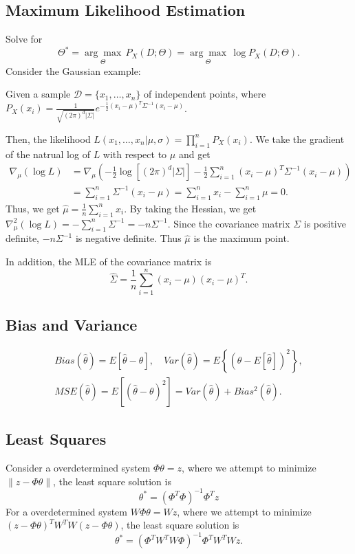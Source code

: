\documentclass{article}
\newenvironment{topic}[1]{\subsection*{#1}}{}
\begin{document}
\begin{topic}{Maximum Likelihood Estimation}
    Solve for
    \[
        \Theta^* = \underset{\Theta}{\arg \max} \, P_X(D;\Theta) = \underset{\Theta}{\arg \max} \, \log P_X(D;\Theta).
    \]
    Consider the Gaussian example: 
    
    Given a sample $\mathcal{D} = \{x_1, \dots , x_n\}$ of independent points, where $P_X(x_i) = \frac{1}{\sqrt{(2\pi)^d|\Sigma|}}e^{-\frac{1}{2}(x_i - \mu)^T\Sigma^{-1}(x_i - \mu)}$.

    Then, the likelihood $L(x_1, \dots, x_n|\mu, \sigma) = \prod_{i = 1}^n P_X(x_i)$.
    We take the gradient of the natrual log of $L$ with respect to $\mu$ and get
    \begin{align*}
        \nabla_{\mu} (\log L) 
        &= \nabla_{\mu} \left(-\frac{1}{2}\log[(2\pi)^d|\Sigma|] - \frac{1}{2} \sum_{i = 1}^n (x_i - \mu)^T\Sigma^{-1}(x_i - \mu)\right) \\
        &= \sum_{i = 1}^n \Sigma^{-1}(x_i - \mu) = \sum_{i = 1}^n x_i - \sum_{i = 1}^n \mu  = 0.
    \end{align*}
    Thus, we get $\hat{\mu} = \frac{1}{n}\sum_{i = 1}^n x_i$. 
    By taking the Hessian, we get $\nabla_{\mu}^2(\log L) = -\sum_{i = 1}^n \Sigma^{-1} = -n\Sigma^{-1}$.
    Since the covariance matrix $\Sigma$ is positive definite, $-n\Sigma^{-1}$ is negative definite. Thus $\hat{\mu}$ is the maximum point.

    In addition, the MLE of the covariance matrix is
    \[
        \hat{\Sigma} = \frac{1}{n}\sum_{i = 1}^n (x_i - \mu)(x_i - \mu)^T.
    \]
\end{topic}

\begin{topic}{Bias and Variance}
    \begin{gather*}
        Bias(\hat{\theta}) = E[\hat{\theta} - \theta], \quad Var(\hat{\theta}) = E\left\{(\hat{\theta} - E[\hat{\theta}])^2\right\}, \\
        MSE(\hat{\theta}) = E\left[(\hat{\theta} - \theta)^2\right] = Var(\hat{\theta}) + Bias^2(\hat{\theta}).
    \end{gather*}
\end{topic}

\begin{topic}{Least Squares}
    Consider a overdetermined system $\Phi\theta = z$, where we attempt to minimize $\lVert z - \Phi\theta \rVert$, the least square solution is
    \[
        \theta^* = (\Phi^T\Phi)^{-1}\Phi^Tz
    \]
    For a overdetermined system $W\Phi\theta = Wz$, where we attempt to minimize $(z - \Phi\theta)^TW^TW(z - \Phi\theta)$, the least square solution is
    \[
        \theta^* = (\Phi^TW^TW\Phi)^{-1}\Phi^TW^TWz.
    \]
\end{topic}
\end{document}
